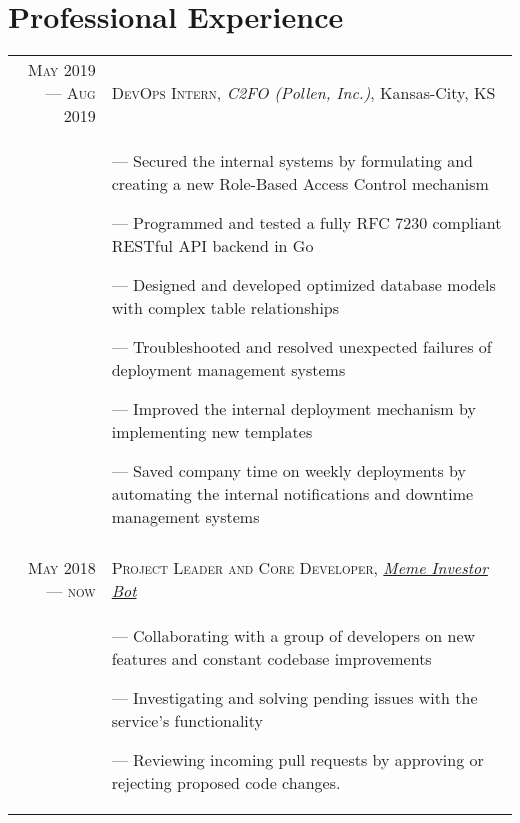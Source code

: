 \documentclass[letterpaper,10pt]{article}
\begin{document}
\section{Professional Experience}
\begin{tabular}{r|p{11cm}}

   

  
  \textsc{May 2019 --- Aug 2019} &  \textsc{DevOps Intern}, \emph{C2FO (Pollen, Inc.)}, Kansas-City, KS\\&\footnotesize{
    --- Secured the internal systems by formulating and creating a new Role-Based Access Control mechanism
   
    --- Programmed and tested a fully RFC 7230 compliant RESTful API backend in Go 
    
    --- Designed and developed optimized database models with complex table relationships
    
    --- Troubleshooted and resolved unexpected failures of deployment management systems
    
    --- Improved the internal deployment mechanism by implementing new templates
    
    --- Saved company time on weekly deployments by automating the internal notifications and downtime management systems

  } \\\multicolumn{2}{c}{}\\
  
  \textsc{May 2018 --- now} &  \textsc{Project Leader and Core Developer}, \emph{\href{https://github.com/MemeInvestor/memeinvestor_bot}{Meme Investor Bot}}\\&\footnotesize{
    --- Collaborating with a group of developers on new features and constant codebase improvements
    
    --- Investigating and solving pending issues with the service's functionality
    
    --- Reviewing incoming pull requests by approving or rejecting proposed code changes.
    
}
\end{tabular}
\end{document}
